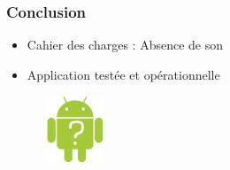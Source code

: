   \begin{frame}
   \frametitle{Conclusion}
 \begin{itemize}
    \item Cahier des charges : Absence de son
    \item Application testée et opérationnelle
   \end{itemize}
   \begin{figure}[H]
    \centering\includegraphics[width=2cm, height=2cm]{Images/ImageSlide14.png}
    \end{figure}
\end{frame}